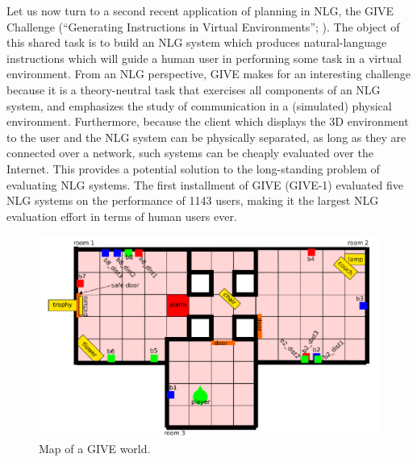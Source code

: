 Let us now turn to a second recent application of planning in NLG, the
GIVE Challenge (``Generating Instructions in Virtual Environments'';
\citealt{ByrKolStrCasDalMooObe09}). The object of this shared task is
to build an NLG system which produces natural-language instructions
which will guide a human user in performing some task in a virtual
environment.  From an NLG perspective, GIVE makes for an interesting
challenge because it is a theory-neutral task that exercises all
components of an NLG system, and emphasizes the study of communication
in a (simulated) physical environment. Furthermore, because the client
which displays the 3D environment to the user and the NLG system can
be physically separated, as long as they are connected over a network,
such systems can be cheaply evaluated over the Internet. This provides
a potential solution to the long-standing problem of evaluating NLG
systems. The first installment of GIVE (GIVE-1) evaluated five NLG
systems on the performance of 1143 users, making it the largest NLG
evaluation effort in terms of human users ever.

\begin{figure}[t]
\centering
\includegraphics[width=0.75\columnwidth]{give_world_2}
\caption{Map of a GIVE world.}
  \label{fig:give-development-world}
\end{figure}

